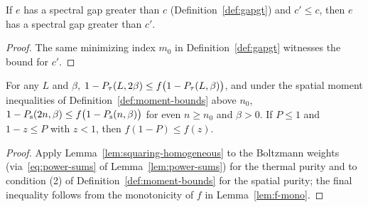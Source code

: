 \begin{lemma}
  \label{lem:gapgt-mono}
  \leanok
  If \(e\) has a spectral gap greater than \(c\) (Definition~\ref{def:gapgt}) and \(c' \le c\), then
  \(e\) has a spectral gap greater than \(c'\).
\end{lemma}
\begin{proof}
  \leanok
  The same minimizing index \(m_0\) in Definition~\ref{def:gapgt} witnesses the bound for \(c'\).
\end{proof}

\begin{lemma}
  \label{lem:defect-squaring}
  \leanok
  For any \(L\) and \(\beta\), \(1 - P_{\tau}(L, 2\beta) \le f\bigl(1 - P_{\tau}(L, \beta)\bigr)\), and under
  the spatial moment inequalities of Definition~\ref{def:moment-bounds} above \(n_0\),
  \(1 - P_{\mathrm{s}}(2n, \beta) \le f\bigl(1 - P_{\mathrm{s}}(n, \beta)\bigr)\) for even \(n \ge n_0\) and
  \(\beta > 0\). If \(P \le 1\) and \(1 - z \le P\) with \(z < 1\), then \(f(1 - P) \le f(z)\).
\end{lemma}
\begin{proof}
  \leanok
  Apply Lemma~\ref{lem:squaring-homogeneous} to the Boltzmann weights (via~\eqref{eq:power-sums} of
  Lemma~\ref{lem:power-sums}) for the thermal purity and to condition (2) of
  Definition~\ref{def:moment-bounds} for the spatial purity; the final inequality follows from the
  monotonicity of \(f\) in Lemma~\ref{lem:f-mono}.
\end{proof}

